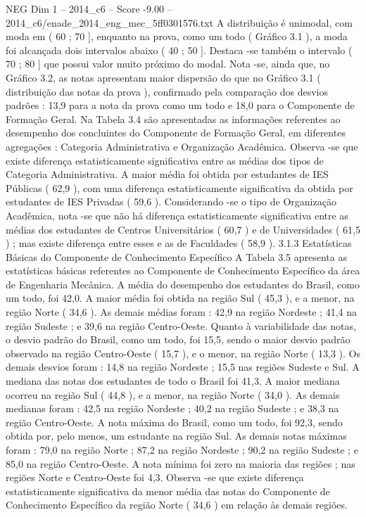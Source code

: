 \begin{textsample}{NEG Dim 1 – 2014\_c6 – Score -9.00 – 2014\_c6/enade\_2014\_eng\_mec\_5ff0301576.txt}
A distribuição é unimodal, com moda em ( 60 ; 70 ], enquanto na prova, como um todo ( Gráfico 3.1 ), a moda foi alcançada dois intervalos abaixo ( 40 ; 50 ].
Destaca -se também o intervalo ( 70 ; 80 ] que possui valor muito próximo do modal.
Nota -se, ainda que, no Gráfico 3.2, as notas apresentam maior dispersão do que no Gráfico 3.1 ( distribuição das notas da prova ), confirmado pela comparação dos desvios padrões : 13,9 para a nota da prova como um todo e 18,0 para o Componente de Formação Geral.
Na Tabela 3.4 são apresentadas as informações referentes ao desempenho dos concluintes do Componente de Formação Geral, em diferentes agregações : Categoria Administrativa e Organização Acadêmica.
Observa -se que existe diferença estatisticamente significativa entre as médias dos tipos de Categoria Administrativa.
A maior média foi obtida por estudantes de IES Públicas ( 62,9 ), com uma diferença estatisticamente significativa da obtida por estudantes de IES Privadas ( 59,6 ).
Considerando -se o tipo de Organização Acadêmica, nota -se que não há diferença estatisticamente significativa entre as médias dos estudantes de Centros Universitários ( 60,7 ) e de Universidades ( 61,5 ) ; mas existe diferença entre esses e as de Faculdades ( 58,9 ). 3.1.3 Estatísticas Básicas do Componente de Conhecimento Específico A Tabela 3.5 apresenta as estatísticas básicas referentes ao Componente de Conhecimento Específico da área de Engenharia Mecânica.
A média do desempenho dos estudantes do Brasil, como um todo, foi 42,0.
A maior média foi obtida na região Sul ( 45,3 ), e a menor, na região Norte ( 34,6 ).
As demais médias foram : 42,9 na região Nordeste ; 41,4 na região Sudeste ; e 39,6 na região Centro-Oeste.
Quanto à variabilidade das notas, o desvio padrão do Brasil, como um todo, foi 15,5, sendo o maior desvio padrão observado na região Centro-Oeste ( 15,7 ), e o menor, na região Norte ( 13,3 ).
Os demais desvios foram : 14,8 na região Nordeste ; 15,5 nas regiões Sudeste e Sul.
A mediana das notas dos estudantes de todo o Brasil foi 41,3.
A maior mediana ocorreu na região Sul ( 44,8 ), e a menor, na região Norte ( 34,0 ).
As demais medianas foram : 42,5 na região Nordeste ; 40,2 na região Sudeste ; e 38,3 na região Centro-Oeste.
A nota máxima do Brasil, como um todo, foi 92,3, sendo obtida por, pelo menos, um estudante na região Sul.
As demais notas máximas foram : 79,0 na região Norte ; 87,2 na região Nordeste ; 90,2 na região Sudeste ; e 85,0 na região Centro-Oeste.
A nota mínima foi zero na maioria das regiões ; nas regiões Norte e Centro-Oeste foi 4,3.
Observa -se que existe diferença estatisticamente significativa da menor média das notas do Componente de Conhecimento Específico da região Norte ( 34,6 ) em relação às demais regiões.

\end{textsample}
